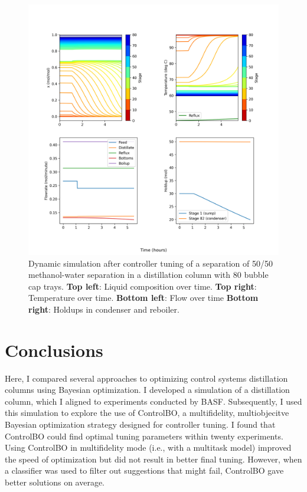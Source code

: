 \begin{figure}
    \centering
    \includegraphics[width=\textwidth]{gfx/Chapter06/mt_c_dynamic.png}
    \caption{Dynamic simulation after controller tuning of a separation of 50/50 methanol-water separation in a distillation column with 80 bubble cap trays. \textbf{Top left}: Liquid composition over time. \textbf{Top right}: Temperature over time. \textbf{Bottom left}: Flow over time \textbf{Bottom right}: Holdups in condenser and reboiler.}
    \label{fig:dynamic_after_tuning}
\end{figure}

\section{Conclusions}

Here, I compared several approaches to optimizing control systems distillation columns using Bayesian optimization. I developed a simulation of a distillation column, which I aligned to experiments conducted by BASF. Subsequently, I used this simulation to explore the use of ControlBO, a multifidelity, multiobjecitve Bayesian optimization strategy designed for controller tuning. I found that ControlBO could find optimal tuning parameters within twenty experiments. Using ControlBO in multifidelity mode (i.e., with a multitask model) improved the speed of optimization but did not result in better final tuning. However, when a classifier was used to filter out suggestions that might fail, ControlBO gave better solutions on average.


